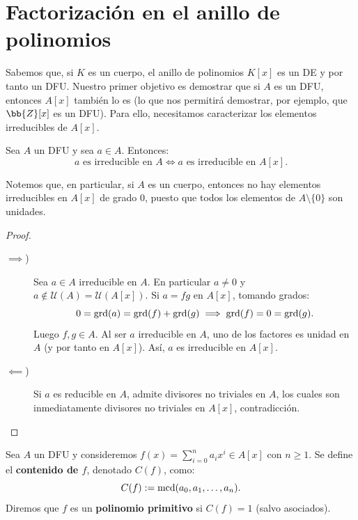 \section{Factorización en el anillo de polinomios}

Sabemos que, si $K$ es un cuerpo, el anillo de polinomios $K[x]$ es un DE y por tanto un DFU. Nuestro primer objetivo es demostrar que si $A$ es un DFU, entonces $A[x]$ también lo es (lo que nos permitirá demostrar, por ejemplo, que $\bb{Z}[x]$ es un DFU). Para ello, necesitamos caracterizar los elementos irreducibles de $A[x]$.
\begin{prop} \label{propIrreduciblesDFUxPolinomios}
    Sea $A$ un DFU y sea $a \in A$. Entonces:
    \[
        a \text{ es irreducible en } A \iff a \text{ es irreducible en } A[x].
    \]

    Notemos que, en particular, si $A$ es un cuerpo, entonces no hay elementos irreducibles en $A[x]$ de grado $0$, puesto que todos los elementos de $A \setminus \{0\}$ son unidades.
\end{prop}
\begin{proof}\leavevmode
\begin{description}
    \item[$\implies$)] Sea $a \in A$ irreducible en $A$. En particular $a \neq 0$ y $a \notin \mathcal{U}(A) = \mathcal{U}(A[x])$. Si $a = fg$ en $A[x]$, tomando grados:
    \[
        0 = \operatorname{grd}(a) = \operatorname{grd}(f) + \operatorname{grd}(g) \implies \operatorname{grd}(f) = 0 = \operatorname{grd}(g).
    \]
    Luego $f, g \in A$. Al ser $a$ irreducible en $A$, uno de los factores es unidad en $A$ (y por tanto en $A[x]$). Así, $a$ es irreducible en $A[x]$.

    \item[$\impliedby$)] Si $a$ es reducible en $A$, admite divisores no triviales en $A$, los cuales son inmediatamente divisores no triviales en $A[x]$, contradicción.
\end{description}
\end{proof}

\begin{definicion}
    Sea $A$ un DFU y consideremos $f(x) = \sum\limits_{i=0}^n a_i x^i \in A[x]$ con $n \geq 1$. Se define el \textbf{contenido de $f$}, denotado $C(f)$, como:
    \[
        C(f) := \operatorname{mcd}(a_0, a_1, \dots, a_n).
    \]
    Diremos que $f$ es un \textbf{polinomio primitivo} si $C(f) = 1$ (salvo asociados).
\end{definicion}

